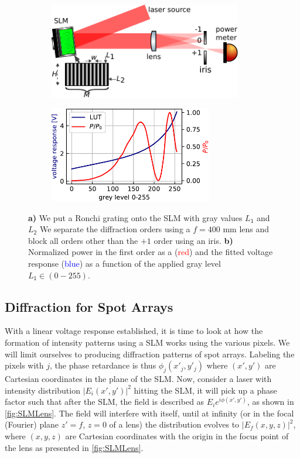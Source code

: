 \begin{figure}
	\begin{subfigure}{.54\linewidth}
	    \flushleft
		\includegraphics[height=4.2cm]{figures/LUTcalibrationSetup.pdf}
		\caption{}
		\label{fig:LUTCalibrationSetup}
	\end{subfigure}
	\hfill
	\begin{subfigure}{.44\linewidth}
	    \flushright
		\includegraphics[height=4.2cm]{figures/LUTplot.pdf}
		\caption{}
		\label{fig:LUTcalibration}
	\end{subfigure}
	\caption{\textbf{a)} We put a Ronchi grating onto the SLM with gray values $\mathsf{\textit{L}_1}$ and $\mathsf{\textit{L}_2}$ We separate the diffraction orders using a $f=400$ mm lens and block all orders other than the $+1$ order using an iris. 
	\textbf{b)} Normalized power in the first order as a (\textcolor{red}{red}) and the fitted voltage response (\textcolor{blue}{blue}) as a function of the applied gray level $\mathsf{\textit{L}_1} \in (0-255)$.}
\end{figure}


\subsection{Diffraction for Spot Arrays}\label{sec:PropagationDerivation}

With a linear voltage response established, it is time to look at how the formation of intensity patterns using a SLM works using the various pixels.
We will limit ourselves to producing diffraction patterns of spot arrays.
Labeling the pixels with $j$, the phase retardance is thus $\phi_j(x'_j,y'_j)$ where $(x',y')$ are Cartesian coordinates in the plane of the SLM.
Now, consider a laser with intensity distribution $|E_i(x',y')|^2$ hitting the SLM, it will pick up a phase factor such that after the SLM, the field is described as $E_i e^{i\phi(x',y')}$, as shown in \cref{fig:SLMLens}. 
The field will interfere with itself, until at infinity (or in the focal (Fourier) plane $z'=f$, $z=0$ of a lens) the distribution evolves to $|E_f(x,y,z)|^2$, where $(x,y,z)$ are Cartesian coordinates with the origin in the focus point of the lens as presented in \cref{fig:SLMLens}.


